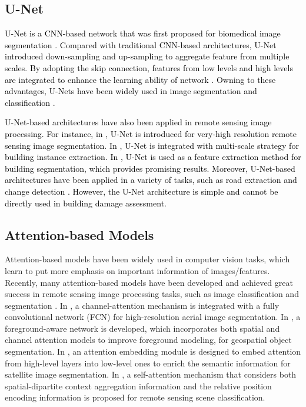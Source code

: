 \documentclass[journal]{IEEEtran}
\begin{document}
\subsection{U-Net}
\textcolor{black}{U-Net is  a  CNN-based  network  that  was  first  proposed for   biomedical  image  segmentation  \cite{UNet}. Compared  with  traditional  CNN-based  architectures,  U-Net introduced down-sampling and up-sampling to aggregate feature from multiple  scales.  By  adopting  the  skip  connection,  features from low levels and high levels are integrated to enhance the learning ability of network  \cite{liuSurveyUshapedNetworks2020}. Owning to these advantages, U-Nets have been widely used in image segmentation \cite{dingMultiscaleFullyConvolutional2020} and classification \cite{liGeometryattentionalNetworkALS2020}. }

\textcolor{black}{U-Net-based architectures have also been applied in remote sensing image processing. For instance, in \cite{chenSymmetricalDenseShortcutDeep2018}, U-Net is introduced for very-high resolution remote sensing image segmentation. In \cite{chenMultiScaleSpatialChannelwise2020}, U-Net is integrated with multi-scale strategy for building instance extraction. In \cite{rsLiBuildingExtraction}, U-Net is used as a feature extraction method for building segmentation, which provides promising results. Moreover, U-Net-based architectures have been applied in a variety of tasks, such as road extraction \cite{xuRoadExtractionHighResolution2018} and change detection \cite{chenDASNetDualAttentive2021}. However, the U-Net architecture is simple and cannot be directly used in building damage assessment. }


\subsection{Attention-based Models}
Attention-based models \cite{Hu_2018_CVPR,wang2018non} have been widely used in computer vision tasks, which learn to put more emphasis on important information of images/features. Recently, many attention-based models have been developed and achieved great success in remote sensing image processing tasks, such as image classification and segmentation \cite{raoBidirectionalGuidedAttention2020, chenMultiScaleSpatialChannelwise2020}. 
In \cite{luoHighResolutionAerialImages2019}, a channel-attention mechanism is integrated with a fully convolutional network (FCN) for high-resolution aerial image segmentation.  
In \cite{Zheng_2020_CVPR}, a foreground-aware network is developed, which incorporates both spatial and channel attention models to improve foreground modeling, for geospatial object segmentation. In \cite{dingLANetLocalAttention2020}, an attention embedding module is designed to embed attention from high-level layers into low-level ones to enrich the semantic information for satellite image segmentation.
In \cite{zhangPositionalContextAggregation2020}, a self-attention mechanism that considers both spatial-dipartite context aggregation
information and the relative position encoding information is proposed for remote sensing scene classification. 
\end{document}
